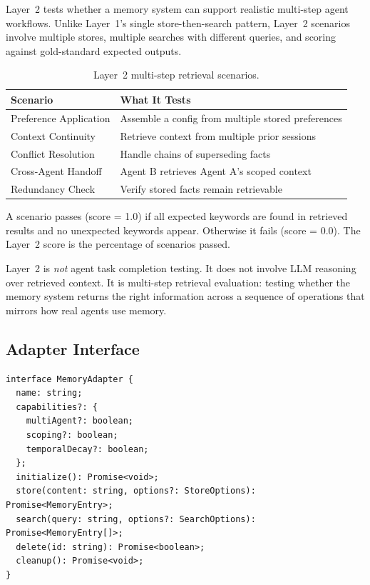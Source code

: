 \documentclass[11pt]{article}
\begin{document}
Layer~2 tests whether a memory system can support realistic multi-step agent workflows. Unlike Layer~1's single store-then-search pattern, Layer~2 scenarios involve multiple stores, multiple searches with different queries, and scoring against gold-standard expected outputs.

\begin{table}[h]
\centering
\begin{tabular}{ll}
\toprule
\textbf{Scenario} & \textbf{What It Tests} \\
\midrule
Preference Application & Assemble a config from multiple stored preferences \\
Context Continuity & Retrieve context from multiple prior sessions \\
Conflict Resolution & Handle chains of superseding facts \\
Cross-Agent Handoff & Agent B retrieves Agent A's scoped context \\
Redundancy Check & Verify stored facts remain retrievable \\
\bottomrule
\end{tabular}
\caption{Layer~2 multi-step retrieval scenarios.}
\label{tab:layer2}
\end{table}

A scenario passes (score = 1.0) if all expected keywords are found in retrieved results and no unexpected keywords appear. Otherwise it fails (score = 0.0). The Layer~2 score is the percentage of scenarios passed.

Layer~2 is \emph{not} agent task completion testing. It does not involve LLM reasoning over retrieved context. It is multi-step retrieval evaluation: testing whether the memory system returns the right information across a sequence of operations that mirrors how real agents use memory.

\subsection{Adapter Interface}

\begin{lstlisting}
interface MemoryAdapter {
  name: string;
  capabilities?: {
    multiAgent?: boolean;
    scoping?: boolean;
    temporalDecay?: boolean;
  };
  initialize(): Promise<void>;
  store(content: string, options?: StoreOptions): Promise<MemoryEntry>;
  search(query: string, options?: SearchOptions): Promise<MemoryEntry[]>;
  delete(id: string): Promise<boolean>;
  cleanup(): Promise<void>;
}
\end{lstlisting}
\end{document}
